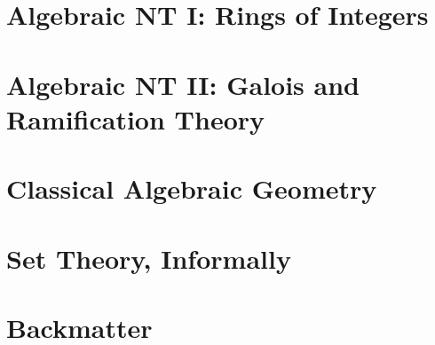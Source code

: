 \documentclass[11pt,numbers=noenddot]{scrreprt}
\begin{document}
\part{Algebraic NT I: Rings of Integers}





\part{Algebraic NT II: Galois and Ramification Theory}




\part{Classical Algebraic Geometry}

\part{Set Theory, Informally}








\part{Backmatter}
\appendix




\clearpage
\printbibliography



%
%
\end{document}
